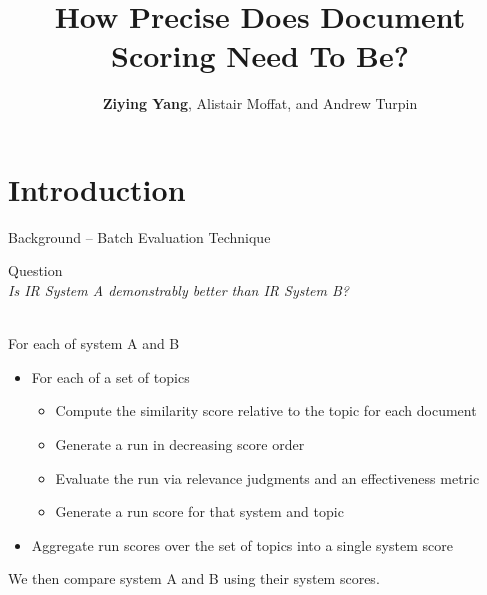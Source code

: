 \documentclass{beamer}
\title{How Precise Does Document Scoring Need To Be?}
\author{\textbf{Ziying Yang}, Alistair Moffat, and Andrew Turpin}
\institute[Universities of Melbourne] %
{
  \inst{}%
  University of Melbourne
}
\date{}
\begin{document}
\begin{frame}
  \titlepage
\end{frame}

\section{Introduction}
\begin{frame}{Background -- Batch Evaluation Technique}
\begin{block}{Question}
\\[0.3em]
\textit{Is IR System A demonstrably better than IR System B?}
\end{block}
\pause
\\[1em]
For each of system A and B\\[0.4em]
\begin{itemize}
  \item For each of a set of topics
  \begin{itemize}
    \item Compute the \alert{similarity score} relative to the topic for each document
    \item Generate a run in decreasing score order
    \item Evaluate the run via relevance judgments and an effectiveness metric
    \item Generate a \alert{run score} for that system and topic
  \end{itemize}
  \pause
  \item Aggregate run scores over the set of topics into a single \alert{system score}\\[1em] 
\end{itemize}

We then compare system A and B using their system scores.
\end{frame}
\end{document}
